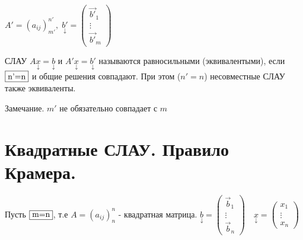 \documentclass[../main.tex]{subfiles}
\begin{document}
$A' = (a_{ij})_{m'}^{n'}, \; \underset{\downarrow}{b'}=\begin{pmatrix} \vec{b'}_{1}\\ \vdots\\ \vec{b'}_{m} \end{pmatrix}$
\begin{definition}
    СЛАУ $A \underset{\downarrow}{x}=\underset{\downarrow}{b}$ и $A'\underset{\downarrow}{x}=\underset{\downarrow}{b'}$ называются равносильными (эквивалентыми), если $\fbox{n'=n}$ и общие решения совпадают. При этом ($n'=n$) несовместные СЛАУ также эквиваленты.
\end{definition} 
\noindent Замечание. $m'$ не обязательно совпадает с $m$
\section{Квадратные СЛАУ. Правило Крамера.}
Пусть $\fbox{m=n}$, т.е $A=(a_{ij})_{n}^{n}$ - квадратная матрица. $\underset{\downarrow}{b}=\begin{pmatrix} \vec{b}_{1}\\ \vdots\\ \vec{b}_{n} \end{pmatrix}\quad \underset{\downarrow}{x}=\begin{pmatrix} {x}_{1}\\ \vdots\\ {x}_{n} \end{pmatrix}$
\end{document}
